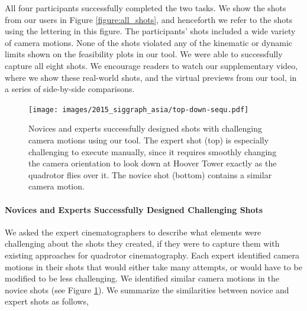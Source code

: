 All four participants successfully completed the two tasks.
We show the shots from our users in Figure \ref{figure:all_shots}, and henceforth we refer to the shots using the lettering in this figure.
The participants' shots included a wide variety of camera motions.
None of the shots violated any of the kinematic or dynamic limits shown on the feasibility plots in our tool.
We were able to successfully capture all eight shots.
We encourage readers to watch our supplementary video, where we show these real-world shots, and the virtual previews from our tool, in a series of side-by-side comparisons.

\begin{figure}[t!]
  \centering
  \texttt{[image: images/2015\_siggraph\_asia/top-down-sequ.pdf]}
  \caption{
Novices and experts successfully designed shots with challenging camera motions using our tool.
The expert shot (top) is especially challenging to execute manually, since it requires smoothly changing the camera orientation to look down at Hoover Tower exactly as the quadrotor flies over it.
The novice shot (bottom) contains a similar camera motion.
}
  \label{figure:expert_novice_comparison}
\end{figure}

\paragraph{Novices and Experts Successfully Designed Challenging Shots}
We asked the expert cinematographers to describe what elements were challenging about the shots they created, if they were to capture them with existing approaches for quadrotor cinematography.
Each expert identified camera motions in their shots that would either take many attempts, or would have to be modified to be less challenging.
We identified similar camera motions in the novice shots (see Figure \ref{figure:expert_novice_comparison}).
We summarize the similarities between novice and expert shots as follows,

